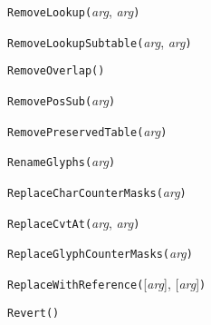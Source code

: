 

\texttt{RemoveLookup(}\textit{arg}, \textit{arg}\texttt{)}



\texttt{RemoveLookupSubtable(}\textit{arg}, \textit{arg}\texttt{)}



\texttt{RemoveOverlap(}\texttt{)}



\texttt{RemovePosSub(}\textit{arg}\texttt{)}



\texttt{RemovePreservedTable(}\textit{arg}\texttt{)}



\texttt{RenameGlyphs(}\textit{arg}\texttt{)}



\texttt{ReplaceCharCounterMasks(}\textit{arg}\texttt{)}



\texttt{ReplaceCvtAt(}\textit{arg}, \textit{arg}\texttt{)}



\texttt{ReplaceGlyphCounterMasks(}\textit{arg}\texttt{)}



\texttt{ReplaceWithReference(}[\textit{arg}], [\textit{arg}]\texttt{)}



\texttt{Revert()}

